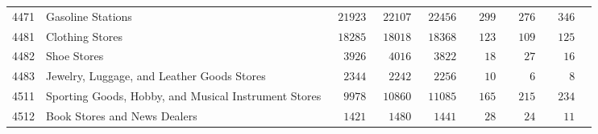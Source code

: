 \documentclass[9pt, oneside]{article}   	%
\begin{document}
\begin{longtable}{lp{3 in}ccccccc}
4471  & Gasoline Stations & $\phantom{0}21923$ & $\phantom{0}22107$ & $\phantom{0}22456$ & $\phantom{00}299$ & $\phantom{00}276$ & $\phantom{00}346$ \\
4481  & Clothing Stores & $\phantom{0}18285$ & $\phantom{0}18018$ & $\phantom{0}18368$ & $\phantom{00}123$ & $\phantom{00}109$ & $\phantom{00}125$ \\
4482  & Shoe Stores & $\phantom{00}3926$ & $\phantom{00}4016$ & $\phantom{00}3822$ & $\phantom{000}18$ & $\phantom{000}27$ & $\phantom{000}16$ \\
4483  & Jewelry, Luggage, and Leather Goods Stores & $\phantom{00}2344$ & $\phantom{00}2242$ & $\phantom{00}2256$ & $\phantom{000}10$ & $\phantom{0000}6$ & $\phantom{0000}8$ \\
4511  & Sporting Goods, Hobby, and Musical Instrument Stores & $\phantom{00}9978$ & $\phantom{0}10860$ & $\phantom{0}11085$ & $\phantom{00}165$ & $\phantom{00}215$ & $\phantom{00}234$ \\
4512  & Book Stores and News Dealers & $\phantom{00}1421$ & $\phantom{00}1480$ & $\phantom{00}1441$ & $\phantom{000}28$ & $\phantom{000}24$ & $\phantom{000}11$ \\


\end{longtable}
\end{document}
